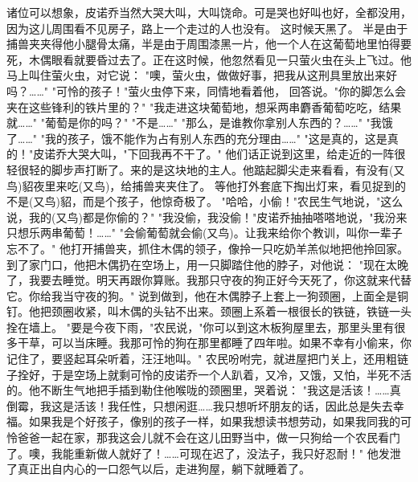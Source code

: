 \documentclass[12pt,UTF8]{ctexbook}
\begin{document}
诸位可以想象，皮诺乔当然大哭大叫，大叫饶命。可是哭也好叫也好，全都没用，因为这儿周围看不见房子，路上一个走过的人也没有。
这时候天黑了。
半是由于捕兽夹夹得他小腿骨太痛，半是由于周围漆黑一片，他一个人在这葡萄地里怕得要死，木偶眼看就要昏过去了。正在这时候，他忽然看见一只萤火虫在头上飞过。他马上叫住萤火虫，对它说：
"噢，萤火虫，做做好事，把我从这刑具里放出来好吗？……"
"可怜的孩子！"萤火虫停下来，同情地看着他，
回答说。"你的脚怎么会夹在这些锋利的铁片里的？"
"我走进这块葡萄地，想采两串麝香葡萄吃吃，结果就……"
"葡萄是你的吗？"
"不是……"
"那么，是谁教你拿别人东西的？……"
"我饿了……"
"我的孩子，饿不能作为占有别人东西的充分理由……"
"这是真的，这是真的！"皮诺乔大哭大叫，"下回我再不干了。"
他们话正说到这里，给走近的一阵很轻很轻的脚步声打断了。来的是这块地的主人。他踮起脚尖走来看看，有没有(又鸟)貂夜里来吃(又鸟)，给捕兽夹夹住了。
等他打外套底下掏出灯来，看见捉到的不是(又鸟)貂，而是个孩子，他惊奇极了。
"哈哈，小偷！"农民生气地说，"这么说，我的(又鸟)都是你偷的？"
"我没偷，我没偷！"皮诺乔抽抽嗒嗒地说，"我汾来只想乐两串葡萄！……"
"会偷葡萄就会偷(又鸟)。让我来给你个教训，叫你一辈子忘不了。"
他打开捕兽夹，抓住木偶的领子，像拎一只吃奶羊羔似地把他拎回家。
到了家门口，他把木偶扔在空场上，用一只脚踏住他的脖子，对他说：
"现在太晚了，我要去睡觉。明天再跟你算账。我那只守夜的狗正好今天死了，你这就来代替它。你给我当守夜的狗。"
说到做到，他在木偶脖子上套上一狗颈圈，上面全是铜钉。他把颈圈收紧，叫木偶的头钻不出来。颈圈上系着一根很长的铁链，铁链一头拴在墙上。
"要是今夜下雨，"农民说，"你可以到这木板狗屋里去，那里头里有很多干草，可以当床睡。我那可怜的狗在那里都睡了四年啦。如果不幸有小偷来，你记住了，要竖起耳朵听着，汪汪地叫。"
农民吩咐完，就进屋把门关上，还用粗链子拴好，于是空场上就剩可怜的皮诺乔一个人趴着，又冷，又饿，又怕，半死不活的。他不断生气地把手插到勒住他喉咙的颈圈里，哭着说：
"我这是活该！……真倒霉，我这是活该！我任性，只想闲逛……我只想听坏朋友的话，因此总是失去幸福。如果我是个好孩子，像别的孩子一样，如果我想读书想劳动，如果我同我的可怜爸爸一起在家，那我这会儿就不会在这儿田野当中，做一只狗给一个农民看门了。噢，我能重新做人就好了！……可现在迟了，没法子，我只好忍耐！"
他发泄了真正出自内心的一口怨气以后，走进狗屋，躺下就睡着了。

\chapter{}
\end{document}
